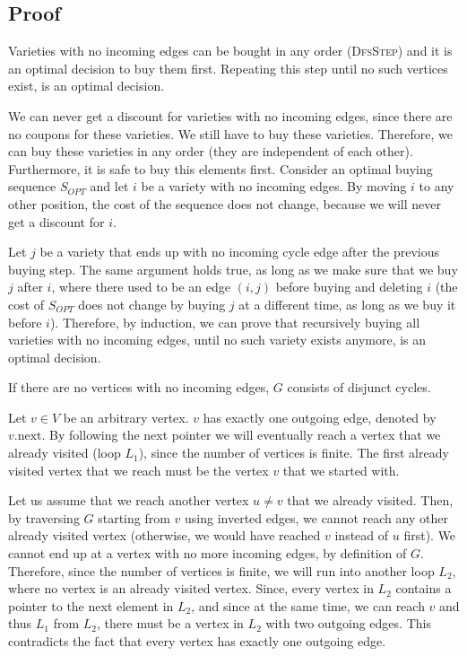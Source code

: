 \documentclass[12pt]{article}
\begin{document}
\subsection*{Proof}
\begin{frm-thm}
Varieties with no incoming edges can be bought in any order (\textsc{DfsStep}) and it is an optimal decision to buy them first. Repeating this step until no such vertices exist, is an optimal decision.
\end{frm-thm}
We can never get a discount for varieties with no incoming edges, since there are no coupons for these varieties. We still have to buy these varieties. Therefore, we can buy these varieties in any order (they are independent of each other). Furthermore, it is safe to buy this elements first. Consider an optimal buying sequence $S_\mathit{OPT}$ and let $i$ be a variety with no incoming edges. By moving $i$ to any other position, the cost of the sequence does not change, because we will never get a discount for $i$.

Let $j$ be a variety that ends up with no incoming cycle edge after the previous buying step. The same argument holds true, as long as we make sure that we buy $j$ after $i$, where there used to be an edge $(i,j)$ before buying and deleting $i$ (the cost of $S_\mathit{OPT}$ does not change by buying $j$ at a different time, as long as we buy it before $i$). Therefore, by induction, we can prove that recursively buying all varieties with no incoming edges, until no such variety exists anymore, is an optimal decision.

\begin{frm-thm}
If there are no vertices with no incoming edges, $G$ consists of disjunct cycles.
\end{frm-thm}
Let $v \in V$ be an arbitrary vertex. $v$ has exactly one outgoing edge, denoted by $v.\mbox{next}$. By following the next pointer we will eventually reach a vertex that we already visited (loop $L_1$), since the number of vertices is finite. The first already visited vertex that we reach must be the vertex $v$ that we started with. 

Let us assume that we reach another vertex $u \not= v$ that we already visited. Then, by traversing $G$ starting from $v$ using inverted edges, we cannot reach any other already visited vertex (otherwise, we would have reached $v$ instead of $u$ first). We cannot end up at a vertex with no more incoming edges, by definition of $G$. Therefore, since the number of vertices is finite, we will run into another loop $L_2$, where no vertex is an already visited vertex. Since, every vertex in $L_2$ contains a pointer to the next element in $L_2$, and since at the same time, we can reach $v$ and thus $L_1$ from $L_2$, there must be a vertex in $L_2$ with two outgoing edges. This contradicts the fact that every vertex has exactly one outgoing edge.
\end{document}
